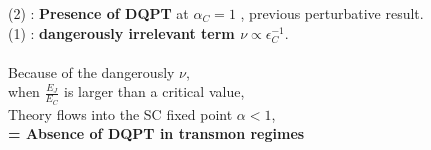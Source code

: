 \documentclass{article}
\begin{document}
(2) : \textbf{Presence of DQPT} at $\alpha_C =1$ , previous perturbative result.\\
(1) : \textbf{dangerously irrelevant term $\nu \propto \epsilon_C^{-1}$}.
\\
\\

Because of the dangerously $\nu$,\\
when $\frac{E_J}{E_C}$ is larger than a critical value,\\
Theory flows into the SC fixed point $\alpha < 1$,\\
\textbf{= Absence of DQPT in transmon regimes}
\end{document}
